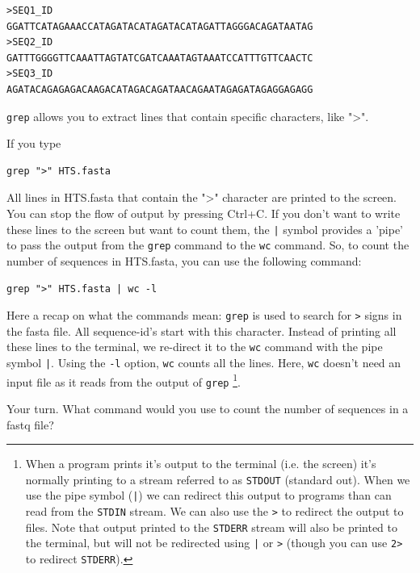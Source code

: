 \documentclass[11pt]{article}
\begin{document}
\begin{verbatim}
>SEQ1_ID
GGATTCATAGAAACCATAGATACATAGATACATAGATTAGGGACAGATAATAG
>SEQ2_ID
GATTTGGGGTTCAAATTAGTATCGATCAAATAGTAAATCCATTTGTTCAACTC
>SEQ3_ID
AGATACAGAGAGACAAGACATAGACAGATAACAGAATAGAGATAGAGGAGAGG
\end{verbatim}

\texttt{grep} allows you to extract lines that contain specific
characters, like ">". 


If you type

\begin{verbatim}
grep ">" HTS.fasta
\end{verbatim}

All lines in HTS.fasta that contain the ">" character are printed to
the screen. You can stop the flow of output by pressing Ctrl+C. If you
don't want to write these lines to the screen but want to count them,
the \texttt{|} symbol provides a 'pipe' to pass the output from the \texttt{grep}
command to the \texttt{wc} command. So, to count the number of
sequences in HTS.fasta, you can use the following command:

\begin{verbatim}
grep ">" HTS.fasta | wc -l
\end{verbatim}

Here a recap on what the commands mean: \texttt{grep} is used to search for
\texttt{>} signs in the fasta file. All sequence-id's start with this
character. Instead of printing all these lines to the terminal, we
re-direct it to the \texttt{wc} command with the pipe symbol \texttt{|}. Using the
\texttt{-l} option, \texttt{wc} counts all the lines. Here, \texttt{wc} doesn't need an
input file as it reads from the output of \texttt{grep} \footnote{When a program prints it's output to the terminal (i.e. the
screen) it's normally printing to a stream referred to as \texttt{STDOUT}
(standard out). When we use the pipe symbol (\texttt{|}) we can redirect this
output to programs than can read from the \texttt{STDIN} stream. We can also
use the \texttt{>} to redirect the output to files. Note that output printed
to the \texttt{STDERR} stream will also be printed to the terminal, but will
not be redirected using \texttt{|} or \texttt{>} (though you can use \texttt{2>} to
redirect \texttt{STDERR}).}.

Your turn. What command would you use to count the number of sequences
in a fastq file?
\end{document}
